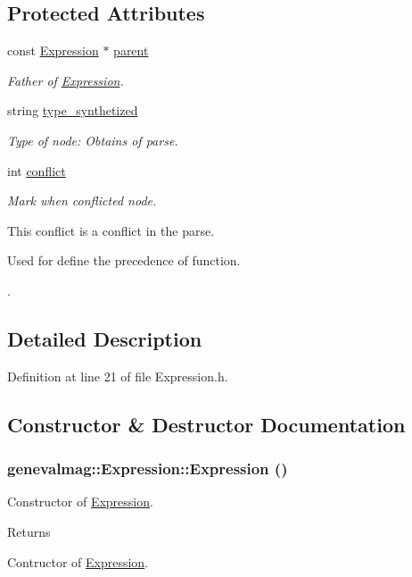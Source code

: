 \subsection*{Protected Attributes}
\begin{DoxyCompactItemize}
\item 
const \hyperlink{classgenevalmag_1_1Expression}{Expression} $\ast$ \hyperlink{classgenevalmag_1_1Expression_a2de0ee2801347dfd9e7b8a3a99d93233}{parent}
\begin{DoxyCompactList}\small\item\em Father of \hyperlink{classgenevalmag_1_1Expression}{Expression}. \item\end{DoxyCompactList}\item 
string \hyperlink{classgenevalmag_1_1Expression_a449dcb5bce7eb0d3c61ef6d468e6460b}{type\_\-synthetized}
\begin{DoxyCompactList}\small\item\em Type of node: Obtains of parse. \item\end{DoxyCompactList}\item 
int \hyperlink{classgenevalmag_1_1Expression_a2770b2edf303704e36bfecfea77fb177}{conflict}
\begin{DoxyCompactList}\small\item\em Mark when conflicted node.\par
 This conflict is a conflict in the parse.\par
 Used for define the precedence of function.\par
. \item\end{DoxyCompactList}\end{DoxyCompactItemize}


\subsection{Detailed Description}


Definition at line 21 of file Expression.h.



\subsection{Constructor \& Destructor Documentation}
\hypertarget{classgenevalmag_1_1Expression_a249f080918dd3203c7dfc8e9e691bc50}{
\subsubsection[{Expression}]{\setlength{\rightskip}{0pt plus 5cm}genevalmag::Expression::Expression ()}}
\label{classgenevalmag_1_1Expression_a249f080918dd3203c7dfc8e9e691bc50}
Constructor of \hyperlink{classgenevalmag_1_1Expression}{Expression}. \begin{DoxyReturn}{Returns}

\end{DoxyReturn}
Contructor of \hyperlink{classgenevalmag_1_1Expression}{Expression}. 

